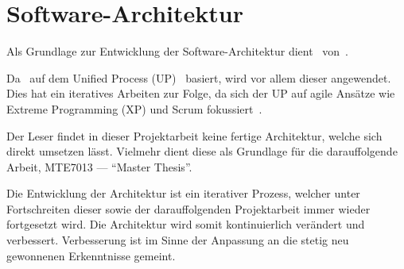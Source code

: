 
\chapter{Software-Architektur}
\label{chap:software-architecture}

Als Grundlage zur Entwicklung der Software-Architektur
dient~ von~\citeauthor{larman_applying_2004}.

Da~\cite{larman_applying_2004} auf dem Unified Process
(UP)~\cite{jacobson_unified_1999} basiert, wird vor allem dieser angewendet.
Dies hat ein iteratives Arbeiten zur Folge, da sich der UP auf agile Ansätze
wie Extreme Programming (XP) und Scrum fokussiert~\cite[S. 18]{larman_applying_2004}.

Der Leser findet in dieser Projektarbeit keine fertige Architektur, welche sich
direkt umsetzen lässt. Vielmehr dient diese als Grundlage für die
darauffolgende Arbeit, MTE7013 --- ``Master Thesis''.

Die Entwicklung der Architektur ist ein iterativer Prozess, welcher unter
Fortschreiten dieser sowie der darauffolgenden Projektarbeit immer wieder
fortgesetzt wird. Die Architektur wird somit kontinuierlich verändert und
verbessert. Verbesserung ist im Sinne der Anpassung an die stetig neu
gewonnenen Erkenntnisse gemeint.








